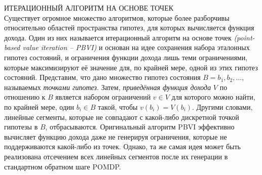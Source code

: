 \documentclass[10pt,a4paper]{article}
\begin{document}
ИТЕРАЦИОННЫЙ АЛГОРИТМ НА ОСНОВЕ ТОЧЕК\\

Существует огромное множество алгоритмов, которые более разборчивы относительно областей пространства гипотез, для которых вычисляется функция дохода. Один из них называется итерационный алгоритм на основе точек \textit{(point-based value iteration – PBVI)} и основан на идее сохранения набора эталонных гипотез состояний, и ограничения функции дохода лишь теми ограничениями, которые максимизируют её значение для, по крайней мере, одной из этих гипотез состояний. Представим, что дано множество гипотез состояния $B = {b_1, b_2,...}$, называемых \textit{точками гипотез}. Затем, \textit{приведённая функция дохода} $V$ по отношению к $B$ является набором ограничений $v\in V$  для которого можно найти, по крайней мере, один $b_i\in B$ такой, чтобы $v(b_i)=V(b_i)$.  Другими словами, линейные сегменты, которые не совпадают с какой-либо дискретной точкой гипотезы в $B$, отбрасываются. Оригинальный алгоритм PBVI эффективно вычисляет функцию дохода даже не генерируя ограничения, которые не поддерживаются какой-либо из точек. Однако, та же самая идея может быть реализована отсечением всех линейных сегментов после их генерации в стандартном обратном шаге POMDP.
\end{document}
